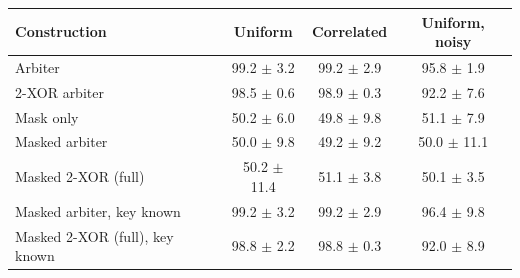 \begin{tabular}{lccc}
\toprule
Construction & Uniform & Correlated & Uniform, noisy \\
\midrule
Arbiter & 99.2 $\pm$ 3.2 & 99.2 $\pm$ 2.9 & 95.8 $\pm$ 1.9 \\
2-XOR arbiter & 98.5 $\pm$ 0.6 & 98.9 $\pm$ 0.3 & 92.2 $\pm$ 7.6 \\
Mask only & 50.2 $\pm$ 6.0 & 49.8 $\pm$ 9.8 & 51.1 $\pm$ 7.9 \\
Masked arbiter & 50.0 $\pm$ 9.8 & 49.2 $\pm$ 9.2 & 50.0 $\pm$ 11.1 \\
Masked 2-XOR (full) & 50.2 $\pm$ 11.4 & 51.1 $\pm$ 3.8 & 50.1 $\pm$ 3.5 \\
\midrule
Masked arbiter, key known & 99.2 $\pm$ 3.2 & 99.2 $\pm$ 2.9 & 96.4 $\pm$ 9.8 \\
Masked 2-XOR (full), key known & 98.8 $\pm$ 2.2 & 98.8 $\pm$ 0.3 & 92.0 $\pm$ 8.9 \\
\bottomrule
\end{tabular}
